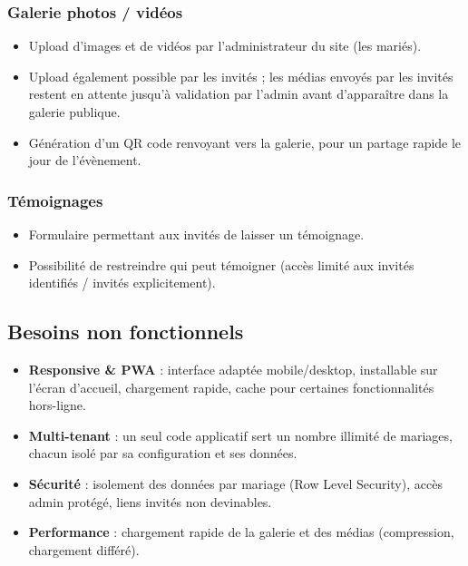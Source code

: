 \documentclass[11pt,a4paper]{article}
\begin{document}
\subsubsection{Galerie photos / vidéos}
\begin{itemize}[leftmargin=1.2cm]
  \item Upload d'images et de vidéos par l'administrateur du site (les mariés).
  \item Upload également possible par les invités ; les médias envoyés par les
        invités restent en attente jusqu'à validation par l'admin avant d'apparaître
        dans la galerie publique.
  \item Génération d'un QR code renvoyant vers la galerie, pour un partage rapide
        le jour de l'évènement.
\end{itemize}

\subsubsection{Témoignages}
\begin{itemize}[leftmargin=1.2cm]
  \item Formulaire permettant aux invités de laisser un témoignage.
  \item Possibilité de restreindre qui peut témoigner (accès limité aux invités
        identifiés / invités explicitement).
\end{itemize}

\subsection{Besoins non fonctionnels}
\begin{itemize}[leftmargin=1.2cm]
  \item \textbf{Responsive \& PWA} : interface adaptée mobile/desktop, installable
        sur l'écran d'accueil, chargement rapide, cache pour certaines
        fonctionnalités hors-ligne.
  \item \textbf{Multi-tenant} : un seul code applicatif sert un nombre illimité de
        mariages, chacun isolé par sa configuration et ses données.
  \item \textbf{Sécurité} : isolement des données par mariage (Row Level Security),
        accès admin protégé, liens invités non devinables.
  \item \textbf{Performance} : chargement rapide de la galerie et des médias
        (compression, chargement différé).
\end{itemize}
\end{document}
